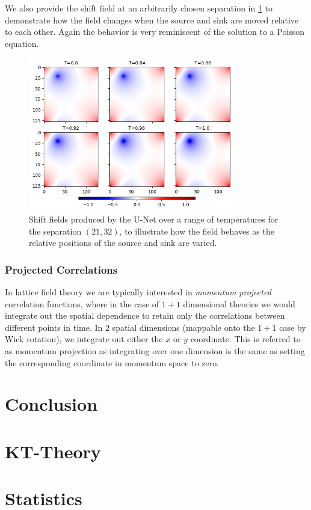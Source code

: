 \documentclass[12pt]{article}
\begin{document}
We also provide the shift field at an arbitrarily chosen separation in \ref{fig:unet_alt_shifts} to demonstrate how the field changes when the source and sink
are moved relative to each other. Again the behavior is very reminiscent of the solution to a Poisson equation.

\begin{figure}
	\centering
	\includegraphics[width=0.8\textwidth]{figures/unet_alt_shifts.png}
	\caption[U-Net Alternate Shifts]{Shift fields produced by the U-Net over a range of temperatures for the separation $(21, 32)$, to illustrate how the field
	behaves as the relative positions of the source and sink are varied.}
	\label{fig:unet_alt_shifts}
\end{figure}

\subsubsection{Projected Correlations}

In lattice field theory we are typically interested in \textit{momentum projected} correlation functions, where in the case of $1+1$ dimensional theories we would
integrate out the spatial dependence to retain only the correlations between different points in time. In $2$ spatial dimensions (mappable onto the $1+1$ case by Wick rotation), 
we integrate out either the $x$ or $y$ coordinate. This is referred to as momentum projection as integrating over one dimension is the same as setting the
corresponding coordinate in momentum space to zero. 


\section{Conclusion}

\begin{appendices}

	\section{KT-Theory}

	\section{Statistics}

\end{appendices}

\newpage
\printbibliography
\end{document}
